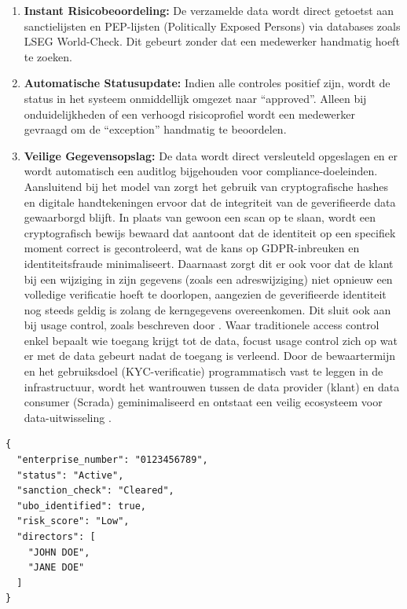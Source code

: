 \begin{enumerate}
    De software vergelijkt automatisch of de persoon in de onboarding voorkomt in de lijst van statutaire bestuurders van de onderneming.
    Een voorbeeld van gestructureerde JSON-data die na een dergelijke controle wordt ontvangen, is te zien in Listing \ref{lst:api-response}.
    \item \textbf{Instant Risicobeoordeling:} De verzamelde data wordt direct getoetst aan sanctielijsten en PEP-lijsten (Politically Exposed Persons) via databases zoals LSEG World-Check. 
    Dit gebeurt zonder dat een medewerker handmatig hoeft te zoeken.
    \item \textbf{Automatische Statusupdate:} Indien alle controles positief zijn, wordt de status in het systeem onmiddellijk omgezet naar ``approved''. 
    Alleen bij onduidelijkheden of een verhoogd risicoprofiel wordt een medewerker gevraagd om de ``exception'' handmatig te beoordelen.
    \item \textbf{Veilige Gegevensopslag:} De data wordt direct versleuteld opgeslagen en er wordt automatisch een auditlog bijgehouden voor compliance-doeleinden.
    Aansluitend bij het model van \autocite{Kumar2020} zorgt het gebruik van cryptografische hashes en digitale handtekeningen ervoor dat de integriteit van de geverifieerde data gewaarborgd blijft.
    In plaats van gewoon een scan op te slaan, wordt een cryptografisch bewijs bewaard dat aantoont dat de identiteit op een specifiek moment correct is gecontroleerd, wat de kans op GDPR-inbreuken en identiteitsfraude minimaliseert.
    Daarnaast zorgt dit er ook voor dat de klant bij een wijziging in zijn gegevens (zoals een adreswijziging) niet opnieuw een volledige verificatie hoeft te doorlopen, aangezien de geverifieerde identiteit nog steeds geldig is zolang de kerngegevens overeenkomen.
    Dit sluit ook aan bij usage control, zoals beschreven door \autocite{vonScherenberg2024}. Waar traditionele access control enkel bepaalt wie toegang krijgt tot de data, 
    focust usage control zich op wat er met de data gebeurt nadat de toegang is verleend. Door de bewaartermijn en het gebruiksdoel (KYC-verificatie) programmatisch vast te leggen in de infrastructuur, 
    wordt het wantrouwen tussen de data provider (klant) en data consumer (Scrada) geminimaliseerd en ontstaat een veilig ecosysteem voor data-uitwisseling \autocite{vonScherenberg2024}.
\end{enumerate}

\begin{listing}[ht]
\begin{verbatim}
{
  "enterprise_number": "0123456789",
  "status": "Active",
  "sanction_check": "Cleared",
  "ubo_identified": true,
  "risk_score": "Low",
  "directors": [
    "JOHN DOE",
    "JANE DOE"
  ]
}
\end{verbatim}
\caption{Voorbeeld van een JSON API-response voor KYC-verificatie.}
\label{lst:api-response}
\end{listing}

